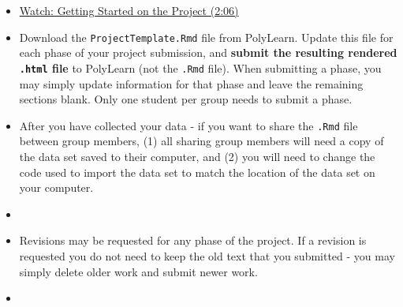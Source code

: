\documentclass[letterpaper,12pt]{report}
\begin{document}
\begin{itemize}
   \item[] \href{https://youtu.be/tGgGguVIxG8}{Watch: Getting Started on the Project (2:06)}
    \item[] Download the \texttt{ProjectTemplate.Rmd} file from PolyLearn.  Update this file for each phase of your project submission, and \textbf{submit the resulting rendered \texttt{.html} file} to PolyLearn (not the \texttt{.Rmd} file).  When submitting a phase, you may simply update information for that phase and leave the remaining sections blank.  Only one student per group needs to submit a phase.
    \item[] After you have collected your data - if you want to share the \texttt{.Rmd} file between group members, (1) all sharing group members will need a copy of the data set saved to their computer, and (2) you will need to change the code used to import the data set to match the location of the data set on your computer.
         \item[]
\end{itemize}

\begin{itemize}
    \item[] Revisions may be requested for any phase of the project.  If a revision is requested you do not need to keep the old text that you submitted - you may simply delete older work and submit newer work.
    \item[]
\end{itemize}
\end{document}
